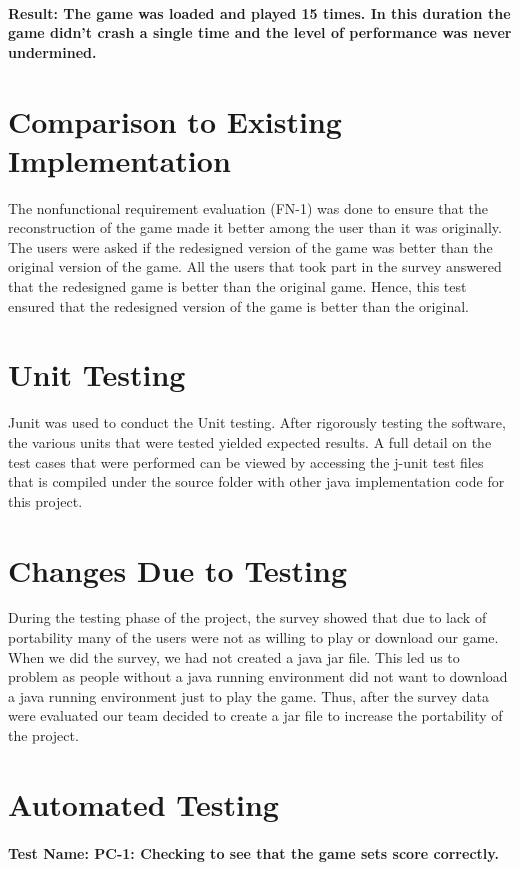 \documentclass[12pt, titlepage]{article}
\begin{document}
\paragraph {Result: The game was loaded and played 15 times. In this duration the game didn’t crash a single time and the level of performance was never undermined.}

	
\section{Comparison to Existing Implementation}	
	The nonfunctional requirement evaluation (FN-1) was done to ensure that the reconstruction of the game made it better among the user than it was originally. The users were asked if the redesigned version of the game was better than the original version of the game. All the users that took part in the survey answered that the redesigned game is better than the original game. Hence, this test ensured that the redesigned version of the game is better than the original. 

\section{Unit Testing}
	Junit was used to conduct the Unit testing. After rigorously testing the software, the various units that were tested yielded expected results. A full detail on the test cases that were performed can be viewed by accessing the j-unit test files that is compiled under the source folder with other java implementation code for this project.

\section{Changes Due to Testing}
During the testing phase of the project, the survey showed that due to lack of portability many of the users were not as willing to play or download our game. When we did the survey, we had not created a java jar file. This led us to problem as people without a java running environment did not want to download a java running environment just to play the game. Thus, after the survey data were evaluated our team decided to create a jar file to increase the portability of the project.

\section{Automated Testing}
\paragraph {Test Name: PC-1: Checking to see that the game sets score correctly.}
\end{document}
